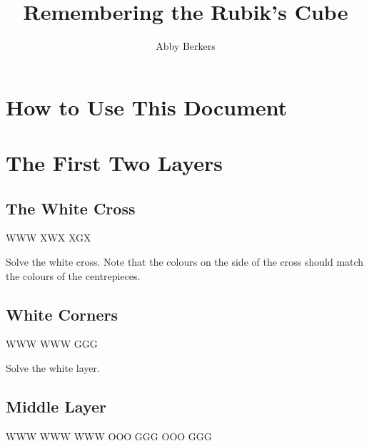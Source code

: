 \documentclass{article}
\title{Remembering the Rubik's Cube}
\author{Abby Berkers}
\begin{document}
    \maketitle
    \RubikCubeSolved
    \begin{minipage}{\textwidth}
        \centering
    \end{minipage}
    \clearpage

    \tableofcontents
    \clearpage

    \setcounter{section}{-1}
    \section{How to Use This Document}
    \section{The First Two Layers}

    \subsection{The White Cross}

    \RubikCubeGreyWY
     {W}{W}{W} {X}{W}{X}
     {X}{G}{X}

    \begin{goal}
        Solve the white cross.
        Note that the colours on the side of the cross should match the colours of the centrepieces.
    \end{goal}


    \subsection{White Corners}

    \RubikCubeGreyWY
     {W}{W}{W} {W}{W}{W}
     {G}{G}{G}

    \begin{goal}
        Solve the white layer.
    \end{goal}


    \subsection{Middle Layer}

    \RubikCubeGreyWY
    \RubikFaceUp WWW WWW WWW
    \RubikSliceTopR OOO GGG
    \RubikSliceMiddleR OOO GGG
\end{document}
